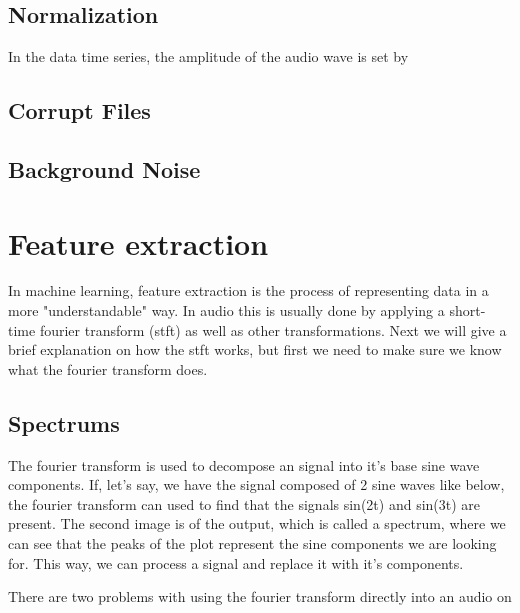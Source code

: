 \documentclass{book}
\begin{document}
\subsection{Normalization}
In the data time series, the amplitude of the audio wave is set by 

\subsection{Corrupt Files}

\subsection{Background Noise}

\section{Feature extraction}
\qquad In machine learning, feature extraction is the process of representing data in a more "understandable" way.
In audio this is usually done by applying a short-time fourier transform (stft) as well as other transformations.
Next we will give a brief explanation on how the stft works, but first we need to make sure we know what the fourier transform does.
\subsection{Spectrums}
\qquad The fourier transform is used to decompose an signal into it's base sine wave components.
If, let's say, we have the signal composed of 2 sine waves like below, the fourier transform can used to find that the signals sin(2t) and sin(3t) are present.
The second image is of the output, which is called a spectrum, where we can see that the peaks of the plot represent the sine components we are looking for.
This way, we can process a signal and replace it with it's components.
\par
There are two problems with using the fourier transform directly into an audio  on 
\end{document}
